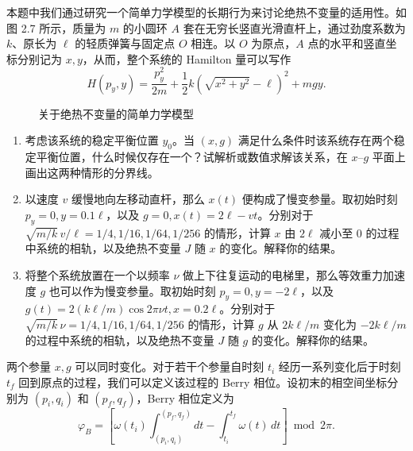 本题中我们通过研究一个简单力学模型的长期行为来讨论绝热不变量的适用性。如图 2.7 所示，质量为 $m$ 的小圆环 $A$ 套在无穷长竖直光滑直杆上，通过劲度系数为 $k$、原长为 $\ell$ 的轻质弹簧与固定点 $O$ 相连。以 $O$ 为原点，$A$ 点的水平和竖直坐标分别记为 $x,y$，从而，整个系统的 Hamilton 量可以写作
\begin{equation}
H(p_y,y)=\frac{p_y^2}{2m}+\frac12k\left(\sqrt{x^2+y^2}-\ell\right)^2+mgy.
\tag{4}
\end{equation}

\begin{figure}[htbp]
\centering
{}
\caption{关于绝热不变量的简单力学模型}
\label{fig:adiabatic-model}
\end{figure}

\begin{enumerate}
\item 考虑该系统的稳定平衡位置 $y_0$。当 $(x,g)$ 满足什么条件时该系统存在两个稳定平衡位置，什么时候仅存在一个？试解析或数值求解该关系，在 $x$--$g$ 平面上画出这两种情形的分界线。
\item 以速度 $v$ 缓慢地向左移动直杆，那么 $x(t)$ 便构成了慢变参量。取初始时刻 $p_y=0,y=0.1\ell$，以及 $g=0,x(t)=2\ell-vt$。分别对于 $\sqrt{m/k}\,v/\ell=1/4,1/16,1/64,1/256$ 的情形，计算 $x$ 由 $2\ell$ 减小至 0 的过程中系统的相轨，以及绝热不变量 $J$ 随 $x$ 的变化。解释你的结果。
\item 将整个系统放置在一个以频率 $\nu$ 做上下往复运动的电梯里，那么等效重力加速度 $g$ 也可以作为慢变参量。取初始时刻 $p_y=0,y=-2\ell$，以及 $g(t)=2(k\ell/m)\cos 2\pi\nu t,x=0.2\ell$。分别对于 $\sqrt{m/k}\,\nu=1/4,1/16,1/64,1/256$ 的情形，计算 $g$ 从 $2k\ell/m$ 变化为 $-2k\ell/m$ 的过程中系统的相轨，以及绝热不变量 $J$ 随 $g$ 的变化。解释你的结果。
\end{enumerate}

两个参量 $x,g$ 可以同时变化。对于若干个参量自时刻 $t_i$ 经历一系列变化后于时刻 $t_f$ 回到原点的过程，我们可以定义该过程的 Berry 相位。设初末的相空间坐标分别为 $(p_i,q_i)$ 和 $(p_f,q_f)$，Berry 相位定义为
\begin{equation}
\varphi_B=\left[\omega(t_i)\int_{(p_i,q_i)}^{(p_f,q_f)}dt-\int_{t_i}^{t_f}\omega(t)\,dt\right]\bmod 2\pi.
\tag{5}
\end{equation}

